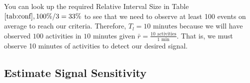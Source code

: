 \documentclass{article}
\begin{document}
You can look up the required Relative Interval Size in Table $\ref{tab:conf}, 100\%/3 = 33\%$ to see
that we need to observe at least 100 events on average to reach our criteria. Therefore, $T_l = 10 \text{ minutes}$ because
we will have observed $100$ activities in $10$ minutes given $\bar{r} = \frac{10 \text{ activities}}{1 \text{ min}}$. That is, we 
must observe 10 minutes of activities to detect our desired signal.


%
%
%



\subsection{Estimate Signal Sensitivity}
\label{ex:3}
\end{document}
